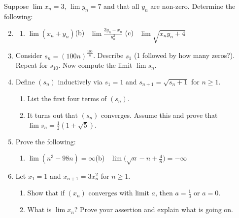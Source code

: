 \begin{exercisessec}{}{}
\exstart Suppose $\lim x_n=3$, $\lim y_n=7$ and that all $y_n$ are non-zero. Determine the following:
\begin{enumerate}\setcounter{enumi}{1}
	\item[]%
  \begin{enumerate}
    \item $\lim(x_n+y_n)$\qquad (b) \ $\lim\frac{3y_n-x_n}{y_n^2}$ \qquad (c) \ $\lim \sqrt{x_ny_n+4}$
  \end{enumerate}
  
  
  \item Consider $s_n=(100n)^{\frac{100}n}$. Describe $s_1$ (1 followed by how many zeros?). Repeat for $s_{10}$. Now compute the limit $\lim s_n$.
  
  
  \item%
  Define $(s_n)$ inductively via $s_1=1$ and $s_{n+1}=\sqrt{s_n+1}$ for $n\ge 1$.
  \begin{enumerate}
	  \item List the first four terms of $(s_n)$.
	  \item It turns out that $(s_n)$ converges. Assume this and prove that $\lim s_n=\frac 12(1+\sqrt 5)$.
  \end{enumerate}
  
  
  \item Prove the following:
  \begin{enumerate}
    \item $\lim(n^3-98n)=\infty$\qquad\qquad (b) \ $\lim \bigl(\sqrt n-n+\frac 4n\bigr)=-\infty$
  \end{enumerate}
  
  
  \item%
  Let $x_1=1$ and $x_{n+1}=3x_n^2$ for $n\ge 1$.
  \begin{enumerate}
	  \item Show that if $(x_n)$ converges with limit $a$, then $a=\frac 13$ or $a=0$.
	  \item What is $\lim x_n$? Prove your assertion and explain what is going on.
  \end{enumerate}
  


\end{enumerate}
\end{exercisessec}
